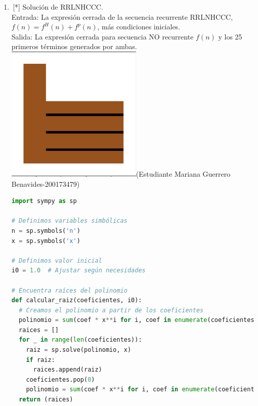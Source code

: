 \begin{enumerate}
\begin{lstlisting}[language=Python]
    if opcion == 1:
      print("Coordenadas en 2D")
      while True:
        print("Seleccione el tipo de gráfica:")
        print("1. Coordenadas Cartesianas 2D")
        print("2. Coordenadas Polares 2D")
        print("3. Atras")
        print(" - - - - - - - - ")
        op = int(input("Escoja opción: "))
        if op == 1:
            coord_cartesianas(funcion)
        elif op == 2:
            coord_polares(funcion)
        elif op == 3:
          break
        else:
            print("Opción no válida. Por favor, ingrese una opción válida.")

    elif opcion == 2:
      print("Coordenadas en 3D")
      while True:
        print("Seleccione el tipo de gráfica:")
        print("1. Coordenadas Rectangulares 3D")
        print("2. Coordenadas Esféricas 3D")
        print("3. Coordenadas Cilíndricas 3D")
        print("4. Atras")
        print(" - - - - - - - - ")
        op = int(input("Escoja opción: "))
        if op == 1:
            coord_rectangulares(funcion)
        elif op == 2:
            coord_esfericas(funcion)
        elif op== 3:
            coord_cilindricas(funcion)
        elif op == 4:
            break
        else:
            print("Opción no válida. Por favor, ingrese una opción válida.")

    elif opcion == 3:
        print("Salida con éxito")
        break
    else:
        print("Opción no válida. Por favor, ingrese una opción válida.")
\end{lstlisting}
    \item \,[*] Solución de RRLNHCCC.\\
    Entrada: La expresión cerrada de la secuencia recurrente RRLNHCCC, $f(n)=f^H(n)+f^p(n)$, más condiciones iniciales. \\
    Salida: La expresión cerrada para secuencia NO recurrente $f(n)$ y los 25 primeros términos generados por ambas.\\
    \includegraphics[width= 10 mm]{figures/exc.png}(Estudiante Mariana Guerrero Benavides-200173479)
    \begin{lstlisting}[language=Python]
    import sympy as sp

# Definimos variables simbólicas
n = sp.symbols('n')
x = sp.symbols('x')

# Definimos valor inicial
i0 = 1.0  # Ajustar según necesidades

# Encuentra raíces del polinomio
def calcular_raiz(coeficientes, i0):
  # Creamos el polinomio a partir de los coeficientes
  polinomio = sum(coef * x**i for i, coef in enumerate(coeficientes[::-1])) 
  raices = []
  for _ in range(len(coeficientes)):
    raiz = sp.solve(polinomio, x)
    if raiz:
      raices.append(raiz)
    coeficientes.pop(0)
    polinomio = sum(coef * x**i for i, coef in enumerate(coeficientes[::-1])) 
  return (raices)


\end{lstlisting}
\end{enumerate}
